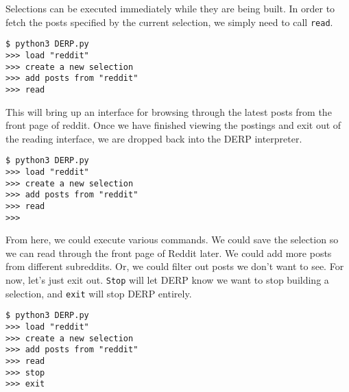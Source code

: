 Selections can be executed immediately while they are being built. In order to fetch the posts specified by the current selection, we simply need to call \texttt{read}.
\newline\begin{minipage}{\linewidth}\begin{lstlisting}
$ python3 DERP.py
>>> load "reddit"
>>> create a new selection
>>> add posts from "reddit"
>>> read
\end{lstlisting}\end{minipage}



This will bring up an interface for browsing through the latest posts from the front page of reddit. Once we have finished viewing the postings and exit out of the reading interface, we are dropped back into the DERP interpreter.
\newline\begin{minipage}{\linewidth}\begin{lstlisting}
$ python3 DERP.py
>>> load "reddit"
>>> create a new selection
>>> add posts from "reddit"
>>> read
>>>
\end{lstlisting}\end{minipage}


From here, we could execute various commands. We could save the selection so we can read through the front page of Reddit later. We could add more posts from different subreddits. Or, we could filter out posts we don’t want to see. For now, let’s just exit out. \texttt{Stop} will let DERP know we want to stop building a selection, and \texttt{exit} will stop DERP entirely.
\newline\begin{minipage}{\linewidth}\begin{lstlisting}
$ python3 DERP.py
>>> load "reddit"
>>> create a new selection
>>> add posts from "reddit"
>>> read
>>> stop
>>> exit
\end{lstlisting}\end{minipage}

